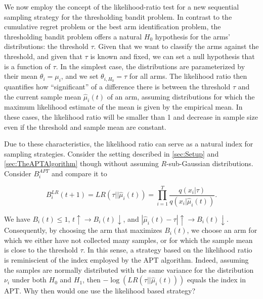 \documentclass[11pt,]{article}
\begin{document}
We now employ the concept of the likelihood-ratio test for a new
sequential sampling strategy for the thresholding bandit problem. In
contrast to the cumulative regret problem or the best arm identification
problem, the thresholding bandit problem offers a natural \(H_0\)
hypothesis for the arms' distributions: the threshold \(\tau\). Given
that we want to classify the arms against the threshold, and given that
\(\tau\) is known and fixed, we can set a null hypothesis that is a
function of \(\tau\). In the simplest case, the distributions are
parameterized by their mean \(\theta_i = \mu_i\), and we set
\(\theta_{i,H_0} = \tau\) for all arms. The likelihood ratio then
quantifies how ``significant'' of a difference there is between the
threshold \(\tau\) and the current sample mean \(\hat{\mu}_i(t)\) of an
arm, assuming distributions for which the maximum likelihood estimate of
the mean is given by the empirical mean. In these cases, the likelihood
ratio will be smaller than 1 and decrease in sample size even if the
threshold and sample mean are constant.

Due to these characteristics, the likelihood ratio can serve as a
natural index for sampling strategies. Consider the setting described in
\autoref{sec:Setup} and \autoref{sec:TheAPTAlgorithm} though without
assuming \(R\)-sub-Gaussian distributions. Consider \(B_i^{APT}\) and
compare it to

\[
B_i^{LR}(t+1) = LR(\tau|| \hat{\mu}_i(t)) = \prod_{i=1}^T\frac{q(x_i|\tau)}{ q(x_i|\hat{\mu}_i(t))}.
\]

We have \(B_i(t) \leq 1\), \(t \uparrow \rightarrow B_i(t) \downarrow\),
and \(|\hat{\mu}_i(t) - \tau| \uparrow \rightarrow B_i(t) \downarrow\).
Consequently, by choosing the arm that maximizes \(B_i(t)\), we choose
an arm for which we either have not collected many samples, or for which
the sample mean is close to the threshold \(\tau\). In this sense, a
strategy based on the likelihood ratio is reminiscient of the index
employed by the APT algorithm. Indeed, assuming the samples are normally
distributed with the same variance for the distribution \(\nu_i\) under
both \(H_0\) and \(H_1\), then \(-\log(LR(\tau||\hat{\mu}_i(t)))\)
equals the index in APT. Why then would one use the likelihood based
strategy?
\end{document}
